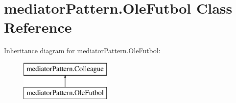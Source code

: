 \hypertarget{classmediator_pattern_1_1_ole_futbol}{}\section{mediator\+Pattern.\+Ole\+Futbol Class Reference}
\label{classmediator_pattern_1_1_ole_futbol}
Inheritance diagram for mediator\+Pattern.\+Ole\+Futbol\+:\begin{figure}[H]
\begin{center}
\leavevmode
\includegraphics[height=2.000000cm]{classmediator_pattern_1_1_ole_futbol}
\end{center}
\end{figure}
